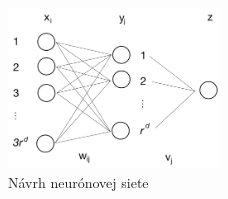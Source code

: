 \begin{figure}[H]
    \centering
    \includegraphics[width=0.5\textwidth]{images/ann.jpg}
    \caption{Návrh neurónovej siete}
\end{figure}

